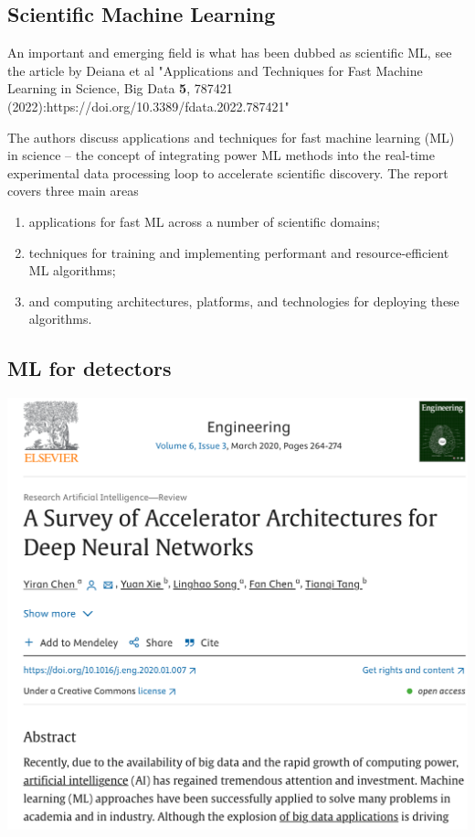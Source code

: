\documentclass[%
oneside,                 %
final,                   %
10pt]{article}
\begin{document}
\subsection{Scientific Machine Learning}

An important and emerging field is what has been dubbed as scientific ML, see the article by Deiana et al "Applications and Techniques for Fast Machine Learning in Science, Big Data \textbf{5}, 787421 (2022):https://doi.org/10.3389/fdata.2022.787421"

\begin{block}{}
The authors discuss applications and techniques for fast machine
learning (ML) in science -- the concept of integrating power ML
methods into the real-time experimental data processing loop to
accelerate scientific discovery. The report covers three main areas

\begin{enumerate}
\item applications for fast ML across a number of scientific domains;

\item techniques for training and implementing performant and resource-efficient ML algorithms;

\item and computing architectures, platforms, and technologies for deploying these algorithms.
\end{enumerate}

\noindent
\end{block}

\subsection{ML for detectors}

\vspace{6mm}

\centerline{\includegraphics[width=1.0\linewidth]{figures/detectors.png}}
\end{document}
